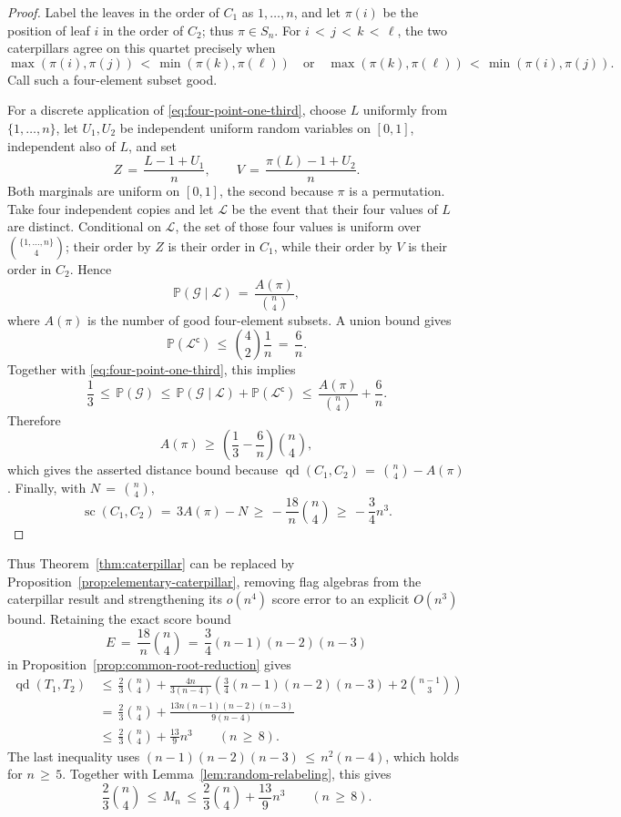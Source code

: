 \documentclass[11pt]{article}
\theoremstyle{definition}
\newcommand{\qd}{\operatorname{qd}}
\newcommand{\score}{\operatorname{sc}}
\begin{document}
\begin{proof}
Label the leaves in the order of $C_1$ as $1,\ldots,n$, and let $\pi(i)$ be
the position of leaf $i$ in the order of $C_2$; thus
$\pi\in S_n$.  For $i\,<\,j\,<\,k\,<\,\ell$, the two caterpillars agree
on this quartet precisely when
\[
 \max(\pi(i),\pi(j))\,<\,\min(\pi(k),\pi(\ell))
 \quad\text{or}\quad
 \max(\pi(k),\pi(\ell))\,<\,\min(\pi(i),\pi(j)).
\]
Call such a four-element subset good.

For a discrete application of \eqref{eq:four-point-one-third}, choose
$L$ uniformly from $\{1,\ldots,n\}$, let $U_1,U_2$ be independent uniform
random variables on $[0,1]$, independent also of $L$, and set
\[
 Z\,=\,\frac{L-1+U_1}{n},
 \qquad
 V\,=\,\frac{\pi(L)-1+U_2}{n}.
\]
Both marginals are uniform on $[0,1]$, the second because $\pi$ is a
permutation.  Take four independent copies and let $\mathcal L$ be the event
that their four values of $L$ are distinct.  Conditional on $\mathcal L$, the
set of those four values is uniform over
$\binom{\{1,\ldots,n\}}4$; their order by $Z$ is their order in $C_1$, while
their order by $V$ is their order in $C_2$.  Hence
\[
 \mathbb P(\mathcal G\mid\mathcal L)
 \,=\,\frac{A(\pi)}{\binom n4},
\]
where $A(\pi)$ is the number of good four-element subsets.  A union bound gives
\[
 \mathbb P(\mathcal L^{\mathsf c})
 \,\leq\,\binom42\frac1n\,=\,\frac6n.
\]
Together with \eqref{eq:four-point-one-third}, this implies
\[
 \frac13
 \,\leq\,\mathbb P(\mathcal G)
 \,\leq\,\mathbb P(\mathcal G\mid\mathcal L)
       +\mathbb P(\mathcal L^{\mathsf c})
 \,\leq\,\frac{A(\pi)}{\binom n4}+\frac6n.
\]
Therefore
\[
 A(\pi)\,\geq\,\left(\frac13-\frac6n\right)\binom n4,
\]
which gives the asserted distance bound because
$\qd(C_1,C_2)\,=\,\binom n4-A(\pi)$.  Finally, with
$N\,=\,\binom n4$,
\[
 \score(C_1,C_2)
 \,=\,3A(\pi)-N
 \,\geq\,-\frac{18}{n}\binom n4
 \,\geq\,-\frac34n^3.
\]
\end{proof}

Thus Theorem~\ref{thm:caterpillar} can be replaced by
Proposition~\ref{prop:elementary-caterpillar}, removing flag algebras from the
caterpillar result and strengthening its $o(n^4)$ score error to an explicit
$O(n^3)$ bound.  Retaining the exact score bound
\[
 E\,=\,\frac{18}{n}\binom n4
 \,=\,\frac34(n-1)(n-2)(n-3)
\]
in Proposition~\ref{prop:common-root-reduction} gives
\begin{align*}
 \qd(T_1,T_2)
 &\,\leq\,\frac23\binom n4+
 \frac{4n}{3(n-4)}
 \left(\frac34(n-1)(n-2)(n-3)+2\binom{n-1}{3}\right)\\
 &\,=\,\frac23\binom n4+
 \frac{13n(n-1)(n-2)(n-3)}{9(n-4)}\\
 &\,\leq\,\frac23\binom n4+\frac{13}{9}n^3
 \qquad(n\,\geq\,8).
\end{align*}
The last inequality uses
$(n-1)(n-2)(n-3)\,\leq\,n^2(n-4)$, which holds for $n\,\geq\,5$.
Together with Lemma~\ref{lem:random-relabeling}, this gives
\[
 \frac23\binom n4
 \,\leq\,M_n
 \,\leq\,\frac23\binom n4+\frac{13}{9}n^3
 \qquad(n\,\geq\,8).
\]

\begingroup
\small
\setlength{\bibsep}{2pt}


\endgroup
\end{document}
